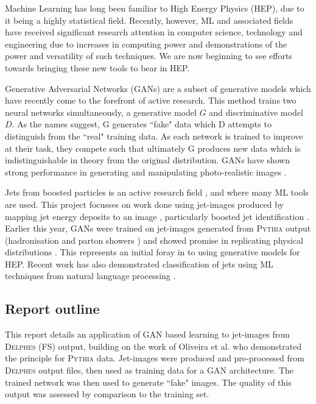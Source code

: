 \documentclass[twocolumn]{article}
\newcommand{\pkg}[1]{\textsc{#1}}
\begin{document}
Machine Learning has long been familiar to High Energy Physics (HEP), due to it being a highly statistical field. Recently, however, ML and associated fields have received significant research attention in computer science, technology and engineering due to increases in computing power and demonstrations of the power and versatility of such techniques. We are now beginning to see efforts towards bringing these new tools to bear in HEP.

Generative Adversarial Networks (GANs) \cite{gan1} are a subset of generative models which have recently come to the forefront of active research. This method trains two neural networks simultaneously, a generative model $G$ and discriminative model $D$. As the names suggest, G generates ``fake" data which D attempts to distinguish from the ``real" training data. As each network is trained to improve at their task, they compete such that ultimately G produces new data which is indistinguishable in theory from the original distribution. GANs have shown strong performance in generating and manipulating photo-realistic images \cite{Radford2015,odena2016conditional,learnww,text2im,GoodfellowNips}.

Jets from boosted particles is an active research field \cite{BOOST}, and where many ML tools are used.  This project focusses on work done using jet-images produced by mapping jet energy deposits to an image \cite{cogan2014jet,de2015jet}, particularly boosted jet identification \cite{Komiske:2016rsd,Almeida:2015jua,Baldi:2016fql}. Earlier this year, GANs were trained on jet-images generated from \pkg{Pythia} output (hadronisation and parton showers \cite{pythia}) and showed promise in replicating physical distributions \cite{de2017learning}. This represents an initial foray in to using generative models for HEP. Recent work has also demonstrated classification of jets using ML techniques from natural language processing \cite{louppe2017qcd}.

\subsection{Report outline}

This report details an application of GAN based learning to jet-images from \pkg{Delphes} (FS) output, building on the work of Oliveira et al. \cite{de2017learning} who demonstrated the principle for \pkg{Pythia} data. Jet-images were produced and pre-processed from \pkg{Delphes} output files, then used as training data for a GAN architecture. The trained network was then used to generate ``fake" images. The quality of this output was assessed by comparison to the training set. 
\end{document}
